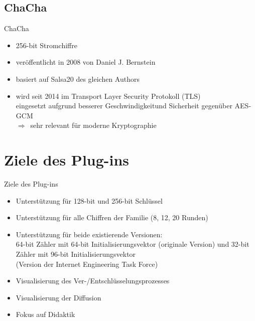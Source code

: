 \documentclass{beamer}
\begin{document}
\subsection{ChaCha}
\begin{frame}{ChaCha}
\renewcommand*{\thefootnote}{\fnsymbol{footnote}}
\begin{itemize}
\item 256-bit Stromchiffre
\item veröffentlicht in 2008 von Daniel J. Bernstein
\item basiert auf Salsa20 des gleichen Authors
\item wird seit 2014 im Transport Layer Security Protokoll (TLS) \\eingesetzt aufgrund besserer Geschwindigkeit\footnotemark und Sicherheit gegenüber AES-GCM\\ $\Rightarrow$\ sehr relevant für moderne Kryptographie
\end{itemize}
\end{frame}

\section{Ziele des Plug-ins}
\begin{frame}{Ziele des Plug-ins}
\begin{itemize}
\item Unterstützung für 128-bit und 256-bit Schlüssel
\item Unterstützung für alle Chiffren der Familie (8, 12, 20 Runden)
\item Unterstützung für beide existierende Versionen: \\64-bit Zähler mit 64-bit Initialisierungsvektor (originale Version) und 32-bit Zähler mit 96-bit Initialisierungsvektor \\(Version der Internet Engineering Task Force)
\item Visualisierung des Ver-/Entschlüsselungsprozesses
\item Visualisierung der Diffusion
\item Fokus auf Didaktik
\end{itemize}
\end{frame}
\end{document}
